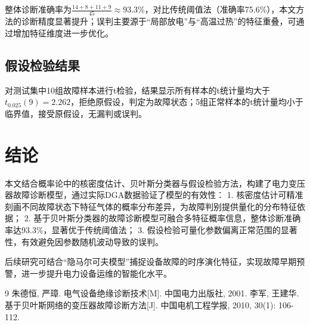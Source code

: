 \documentclass[12pt,a4paper]{article}
\begin{document}
整体诊断准确率为$\frac{14+8+11+9}{45} \approx 93.3\%$，对比传统阈值法（准确率75.6\%），本文方法的诊断精度显著提升；误判主要源于“局部放电”与“高温过热”的特征重叠，可通过增加特征维度进一步优化。

\subsection{假设检验结果}
对测试集中10组故障样本进行t检验，结果显示所有样本的t统计量均大于$t_{0.025}(9)=2.262$，拒绝原假设，判定为故障状态；5组正常样本的t统计量均小于临界值，接受原假设，无漏判或误判。

\section{结论}
本文结合概率论中的核密度估计、贝叶斯分类器与假设检验方法，构建了电力变压器故障诊断模型，通过实际DGA数据验证了模型的有效性：
1. 核密度估计可精准刻画不同故障状态下特征气体的概率分布差异，为故障判别提供量化的分布特征依据；
2. 基于贝叶斯分类器的故障诊断模型可融合多特征概率信息，整体诊断准确率达93.3\%，显著优于传统阈值法；
3. 假设检验可量化参数偏离正常范围的显著性，有效避免因参数随机波动导致的误判。

后续研究可结合“隐马尔可夫模型”捕捉设备故障的时序演化特征，实现故障早期预警，进一步提升电力设备运维的智能化水平。

\begin{thebibliography}{9}
 朱德恒, 严璋. 电气设备绝缘诊断技术[M]. 中国电力出版社, 2001.
 李军, 王建华. 基于贝叶斯网络的变压器故障诊断方法[J]. 中国电机工程学报, 2010, 30(1): 106-112.
\end{thebibliography}
\end{document}
